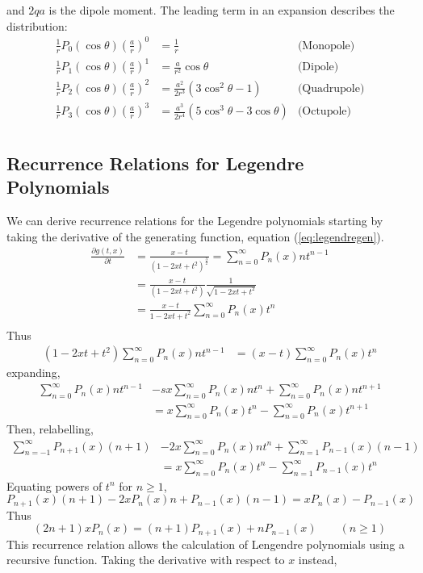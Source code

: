     and $2qa$ is the dipole moment.  The leading term in an expansion
    describes the distribution:
    \begin{align*}
      \frac{1}{r} P_0 (\cos \theta) \left(\frac{a}{r}\right)^0 &= \frac{1}{r} & \text{(Monopole)} \\
      \frac{1}{r} P_1 (\cos \theta) \left(\frac{a}{r}\right)^1 &= \frac{a}{r^2} \cos \theta & \text{(Dipole)} \\
      \frac{1}{r} P_2 (\cos \theta) \left(\frac{a}{r}\right)^2 &= \frac{a^2}{2r^3} (3\cos^2 \theta - 1) & \text{(Quadrupole)} \\
      \frac{1}{r} P_3 (\cos \theta) \left(\frac{a}{r}\right)^3 &= \frac{a^3}{2r^4} (5\cos^3 \theta - 3 \cos \theta) & \text{(Octupole)} \\
    \end{align*}

    \subsection{Recurrence Relations for Legendre Polynomials}
    \label{sec:recurrencelegendre}

    We can derive recurrence relations for the Legendre polynomials
    starting by taking the derivative of the generating function,
    equation (\ref{eq:legendregen}).
    \begin{align*}
      \frac{\partial g(t,x)}{\partial t} &= \frac{x-t}{(1-2xt+t^2)^{\frac{3}{2}}} = \sum_{n=0}^{\infty} P_n(x)nt^{n-1} \\
      &= \frac{x-t}{(1-2xt+t^2)}\frac{1}{\sqrt{1-2xt+t^2}} \\
      &= \frac{x-t}{1-2xt+t^2} \sum_{n=0}^{\infty}P_n(x) t^n \\
    \end{align*}
    Thus
    \begin{align*}
      (1-2xt+t^2) \sum_{n=0}^{\infty} P_n(x) nt^{n-1} &= (x-t)
      \sum_{n=0}^{\infty} P_n(x) t^n
    \end{align*}
    expanding,
    \begin{align*}
      \sum_{n=0}^{\infty} P_n(x) nt^{n-1} &- sx \sum_{n=0}^{\infty} P_n(x) nt^n + \sum_{n=0}^{\infty} P_n(x) nt^{n+1} \\
      &= x \sum_{n=0}^{\infty} P_n(x)t^n - \sum_{n=0}^{\infty} P_n(x)
      t^{n+1}
    \end{align*}
    Then, relabelling,
    \begin{align*}
      \sum_{n=-1}^{\infty} P_{n+1}(x)(n+1) &- 2x \sum_{n=0}^{\infty} P_n(x) nt^n + \sum_{n=1}^{\infty} P_{n-1}(x)(n-1) \\
      &= x \sum_{n=0}^{\infty} P_n(x) t^n - \sum_{n=1}^{\infty}
      P_{n-1}(x) t^n
    \end{align*}
    Equating powers of $t^n$ for $n \ge 1$,
    \[ P_{n+1}(x)(n+1) - 2x P_n(x)n + P_{n-1}(x)(n-1) = xP_n(x) -
    P_{n-1}(x) \] Thus
    \[ (2n+1) x P_n(x) = (n+1) P_{n+1}(x) + nP_{n-1}(x) \qquad (n \ge
    1) \] This recurrence relation allows the calculation of Lengendre
    polynomials using a recursive function.  Taking the derivative
    with respect to $x$ instead,

